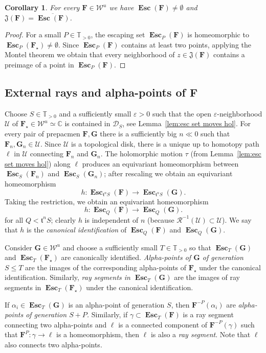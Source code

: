 \documentclass{amsart}
\newcommand{\1}{{\mathbb 1 }}
\newcommand\PT{\mathbb{ T}}
\newcommand\RR{\mathcal{R}}
\newcommand\Jul{{\mathfrak J}}
\newcommand{\bF}{{\mathbf F}}
\newcommand{\bG}{{\mathbf G}}
\newcommand{\str}{{\star}}
\renewcommand{\tt}{\mathfrak{t}}
\newcommand\Unst{{\boldsymbol{\mathcal{W}}^u}}
\newcommand\bUU{{ \boldsymbol{\mathcal U}}}
\newcommand{\C}{\mathbb{C}}
\newtheorem{cor}[thm]{Corollary}
\theoremstyle{remark}
\numberwithin{equation}{section}
\theoremstyle{definition}
\newcommand{\Esc}{{\boldsymbol{\operatorname{Esc}}}}
\newcommand{\DEsc}{{\boldsymbol{\mathcal D}}}
\theoremstyle{nonumberbreak}
\begin{document}
\begin{cor}
\label{cor:Jul is ovl Esc}
For every $\bF\in \Unst$ we have $\Esc(\bF)\not=\emptyset$ and $\Jul (\bF)=\overline {\Esc(\bF)}$.  
\end{cor}
\begin{proof}
For a small $P\in \PT_{>0}$, the escaping set $\Esc_P(\bF)$ is homeomorphic to $\Esc_P(\bF_\str)\not=\emptyset$. Since $\Esc_P(\bF)$ contains at least two points, applying the Montel theorem we obtain that every neighborhood of $z\in \Jul (\bF)$ contains a preimage of  a point in  $\Esc_P(\bF)$.  
\end{proof}

\subsection{External rays and alpha-points of $\bF$} Choose $S\in \PT_{>0}$ and a sufficiently small $\varepsilon>0$ such that the open $\varepsilon$-neighborhood $\bUU$ of $\bF_\str\in\Unst\simeq \C$ is contained in $ \DEsc_S$, see Lemma~\ref{lem:esc set moves hol}. For every pair of prepacmen $\bF,\bG$ there is a sufficiently big $n\ll 0$ such that $\bF_n, \bG_n\in \bUU$. Since $\bUU$ is a topological disk, there is a unique up to homotopy path $\ell$ in $\bUU$ connecting $\bF_n$ and $\bG_n$. The holomorphic motion  $\tau$ (from Lemma~\ref{lem:esc set moves hol}) along $\ell$ produces an equivariant homeomorphism between $\Esc_S(\bF_n)$ and $\Esc_S(\bG_n)$; after rescaling we obtain an equivariant homeomorphism
 \[h\colon \Esc_{\tt^n S}(\bF)\to \Esc_{\tt^n S}(\bG). \]
Taking the restriction, we obtain an equivariant homeomorphism 
\[h\colon \Esc_{Q}(\bF)\to \Esc_{Q}(\bG). \]
for all $Q<\tt^n S$; clearly $h$ is independent of $n$ (because $\RR^{-1}(\bUU)\subset \bUU$). We say that $h$ is the \emph{canonical identification} of $\Esc_{Q}(\bF)$ and $\Esc_Q(\bG)$.


Consider $\bG\in \Unst$ and choose a sufficiently small $T\in \PT_{>0}$ so that $\Esc_T(\bG)$ and $\Esc_T(\bF_\str)$ are canonically identified.  \emph{Alpha-points of $\bG$ of generation $S\le T$} are the images of the corresponding alpha-points of $\bF_\str$ under the canonical identification. Similarly, \emph{ray segments in $\Esc_T(\bG)$}  are the images of ray segments in $\Esc_T(\bF_\str)$ under the canonical identification. 

If $\alpha_i\in \Esc_T(\bG)$ is an alpha-point of generation $S$, then $\bF^{-P}(\alpha_i)$ are \emph{alpha-points of generation $S+P$.} Similarly, if $\gamma \subset \Esc_T(\bF)$ is a ray segment connecting two alpha-points and $\ell$ is a connected component of $ \bF^{-P}(\gamma)$ such that $\bF^P\colon \gamma\to \ell $ is a homeomorphism, then $\ell$ is also a \emph{ray segment}. Note that $\ell$ also connects two alpha-points.
 
\end{document}
